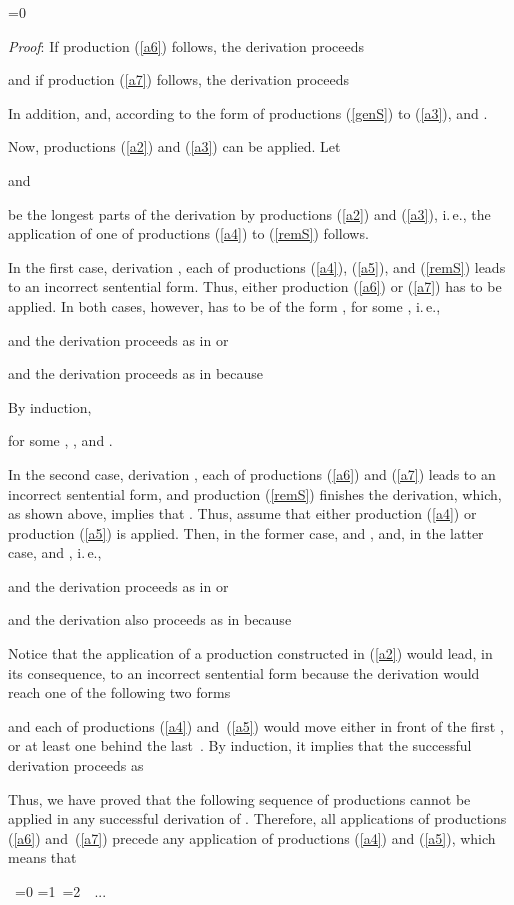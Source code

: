 \documentclass[copyright]{eptcs}
\makeatletter
\newcounter{d@proof}\let\thed@proof\relax\setcounter{d@proof}{0}
\newcommand*{\qed}{}
\newenvironment{proof}{\ifnum \value{d@proof}=0{\setcounter{claim}{0}}\else\fi
  \stepcounter{d@proof}\par\noindent
  {\rmfamily\itshape\mdseries Proof\/}:\hspace{\labelsep}\ignorespaces}{\addtocounter{d@proof}{-1}\mbox{}\nolinebreak\hfill~\ifnum \value{d@proof}=0{\qed}\else
    \ifnum \value{d@proof}=1{\qed\nolinebreak\,\nolinebreak\qed}\else
      \ifnum \value{d@proof}=2{\qed\nolinebreak\,\nolinebreak\qed
          \nolinebreak\,\nolinebreak\qed}\else
        {\qed\nolinebreak...\nolinebreak\qed}\fi\fi\fi
  \medbreak
}
\makeatother
\begin{document}
\begin{proof}
    If production (\ref{a6}) follows, the derivation proceeds
    
    and if production (\ref{a7}) follows, the derivation proceeds
    
    In addition,  and, according to the form of productions (\ref{genS}) 
    to (\ref{a3}),
     and .

    Now, productions (\ref{a2}) and (\ref{a3}) can be applied. Let
    
    and
    
    be the longest parts of the derivation by productions (\ref{a2}) and (\ref{a3}), i.\,e., the application of one of productions (\ref{a4}) to (\ref{remS}) follows.

     In the first case, derivation , each of productions (\ref{a4}), (\ref{a5}), and (\ref{remS}) leads to an incorrect sentential form. Thus, either production (\ref{a6}) or (\ref{a7}) has to be applied. In both cases, however,  has to be of the form , for some , i.\,e.,
    
    and the derivation proceeds as in  or
    
    and the derivation proceeds as in  because 
     
    By induction,
    
    for some , , and
    .

     In the second case, derivation , each of productions (\ref{a6}) 
    and (\ref{a7}) leads to an incorrect sentential form, and production (\ref{remS}) 
    finishes the derivation, which, as shown above, implies that \hbox{}. Thus, 
    assume that either production (\ref{a4}) or production (\ref{a5}) is applied. Then, in 
    the former case,\linebreak
     and , and, in the latter case,  and , i.\,e.,
    
    and the derivation proceeds as in  or
    
    and the derivation also proceeds as in  because 
    
    Notice that the application of a production 
    constructed in (\ref{a2}) would lead, in its consequence, to an incorrect sentential 
    form because the derivation would reach one of the following two forms 
    
    and each of productions (\ref{a4}) and~(\ref{a5}) would move 
    either  in front of the first , or at least one  behind the last~.  
    By induction, it implies that the successful derivation proceeds as
    

    Thus, we have proved that the following sequence of productions  cannot be applied in any successful derivation of . Therefore, all applications of productions (\ref{a6}) 
    and~(\ref{a7}) precede any application of productions (\ref{a4}) and (\ref{a5}), which means that 


\end{proof}
\end{document}
